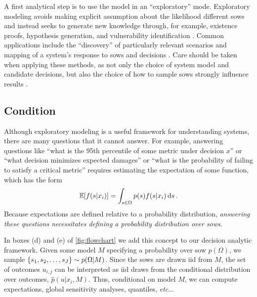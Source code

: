\documentclass[12pt]{article}
\makeatletter
\newcommand{\james}[1]{\todo[color=giallo, textcolor=nero]{\textbf{ATTN James:~}#1}} %
\DeclareRobustCommand\onedot{\futurelet\@let@token\@onedot}
\def\@onedot{\ifx\@let@token.\else.\null\fi\xspace}
\def\etc{\emph{etc}\onedot} \def\vs{\emph{vs}\onedot}
\DeclareRobustCommand\onedot{\futurelet\@let@token\@onedot}
\def\@onedot{\ifx\@let@token.\else.\null\fi\xspace}
\def\etc{\emph{etc}\onedot} \def\vs{\emph{vs}\onedot}
\makeatother
\begin{document}
A first analytical step is to use the model in an ``exploratory'' mode.
Exploratory modeling avoids making explicit assumption  about the likelihood different \glspl{sow} and instead seeks to generate new knowledge through, for example, existence proofs, hypothesis generation, and vulnerability identification \citep{bankes:1993}.
Common applications include the ``discovery'' of particularly relevant scenarios  \citep{lamontagne_discovery:2018,groves_scenarios:2007} and mapping of a system's response to \glspl{sow} and decisions \citep{Brown:2012kb,Poff:2015jn,Steinschneider:2015kk,sriver_sealevel:2018}.
Care should be taken when applying these methods, as not only the choice of system model and candidate decisions, but also the choice of how to sample \glspl{sow} strongly influence results \citep[see][]{quinn_exploratory:2020}.

\subsection{Condition}\label{sec:analysis-condition}

Although exploratory modeling is a useful framework for understanding systems, there are many questions that it cannot answer.
For example, answering questions like ``what is the 95th percentile of some metric under decision $x$'' or ``what decision minimizes expected damages'' or ``what is the probability of failing to satisfy a critical metric'' requires estimating the expectation of some function, which has the form
\begin{equation}
    \mathbb{E}\qty[f(s | x_i)] = \int_{s \in \Omega} p(s) f(s | x_i) \dd{s}.
\end{equation}
Because expectations are defined relative to a probability distribution, \emph{answering these questions necessitates defining a probability distribution over \glspl{sow}}.

In boxes (d) and (e) of \cref{fig:flowchart} we add this concept to our decision analytic framework.
Given some model $M$ specifying a probability over \gls{sow} $p(\Omega)$, we sample $\qty{s_1, s_2, \ldots, s_J} \sim p(\Omega | M)$.
Since the \glspl{sow} are drawn \gls{iid} from $M$, the set of outcomes $u_{i, j}$ can be interpreted as \gls{iid} draws from the conditional distribution over outcomes, $\hat{p}(u | x_i, M)$.
Thus, conditional on model $M$, we can compute expectations, global sensitivity analyses, quantiles, \etc.\james{wording}
\end{document}
